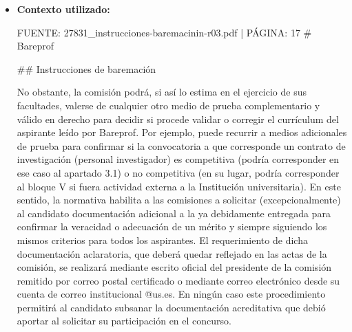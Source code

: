 \documentclass{article}
\begin{document}
\begin{itemize}
\begin{itemize}
                * La puntuación se calculará según los criterios establecidos en el baremo vigente.
                * La comisión de contratación podrá solicitar documentación adicional para confirmar la veracidad o adecuación de un mérito.

                \textbf{Respuesta a la pregunta del usuario:}
                No, según las instrucciones del baremo vigentes, no se puede valorar un mismo artículo simultáneamente en los apartados de investigación y docencia, ya que se consideraría duplicidad de méritos. Sin embargo, se pueden valorar diferentes aspectos de un mismo trabajo, como la producción científica y la docencia impartida, siempre que se incluyan en apartados diferentes y no se considere duplicidad de méritos.

                \textbf{Ejemplos de valoración:}

                * Un artículo publicado en una revista científica se puede valorar en el apartado de investigación, pero no se puede valorar el mismo artículo en el apartado de docencia.
                * Un contrato de investigación se puede valorar en el apartado de investigación, y la docencia impartida durante ese contrato se puede valorar en el apartado de docencia, siempre que se cumplan los requisitos establecidos en el baremo.
          \item \textbf{Contexto utilizado:}
                \begin{scriptsize}
                  FUENTE: 27831\_instrucciones-baremacinin-r03.pdf | PÁGINA: 17
                  \# Bareprof

                  \#\# Instrucciones de baremación

                  No obstante, la comisión podrá, si así lo estima en el ejercicio de sus facultades, valerse de cualquier otro medio de prueba complementario y válido en derecho para decidir si procede validar o corregir el currículum del aspirante leído por Bareprof. Por ejemplo, puede recurrir a medios adicionales de prueba para confirmar si la convocatoria a que corresponde un contrato de investigación (personal investigador) es competitiva (podría corresponder en ese caso al apartado 3.1) o no competitiva (en su lugar, podría corresponder al bloque V si fuera actividad externa a la Institución universitaria). En este sentido, la normativa habilita a las comisiones a solicitar (excepcionalmente) al candidato documentación adicional a la ya debidamente entregada para confirmar la veracidad o adecuación de un mérito y siempre siguiendo los mismos criterios para todos los aspirantes. El requerimiento de dicha documentación aclaratoria, que deberá quedar reflejado en las actas de la comisión, se realizará mediante escrito oficial del presidente de la comisión remitido por correo postal certificado o mediante correo electrónico desde su cuenta de correo institucional @us.es. En ningún caso este procedimiento permitirá al candidato subsanar la documentación acreditativa que debió aportar al solicitar su participación en el concurso.


\end{scriptsize}
\end{itemize}
\end{itemize}
\end{document}
